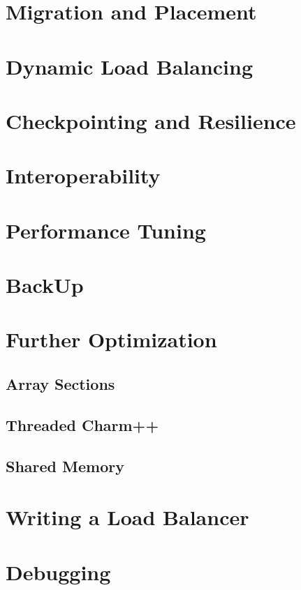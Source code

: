 \documentclass{beamer}
\begin{document}
\section[PUP and Placement]{Migration and Placement}

\section[LB]{Dynamic Load Balancing}

\section[Fault Tol]{Checkpointing and Resilience}


\section[AMPI & Interop]{Interoperability}

\section[Tuning]{Performance Tuning}



\section{BackUp}
\section[Messages, Groups, Shared Mem]{Further Optimization}

\subsection[Array Sections]{Array Sections}

\subsection[Threaded]{Threaded Charm++}

\subsection{Shared Memory}

\section[Custom LB]{Writing a Load Balancer}

\section[Debugging]{Debugging}

\end{document}
